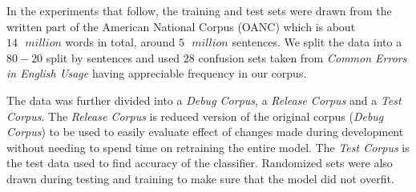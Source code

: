 

In the experiments that follow, the training and test sets were drawn from the
written part of the American National Corpus (OANC) which is about \(14\text{\ } million\)
words in total, around \(5\text{\ } million\) sentences. We split the data into a \(80-20\)
split by sentences and used \(28\) confusion sets taken from \textit{Common
Errors in English Usage} \cite{website:paulbrians} having appreciable frequency
in our corpus.

The data was further divided into a \textit{Debug Corpus}, a \textit{Release
Corpus} and a \textit{Test Corpus}. The \textit{Release Corpus} is reduced
version of the original corpus (\textit{Debug Corpus}) to be used to easily
evaluate effect of changes made during development without needing to spend
time on retraining the entire model. The \textit{Test Corpus} is the test data
used to find accuracy of the classifier. Randomized sets were also drawn during
testing and training to make sure that the model did not overfit.

